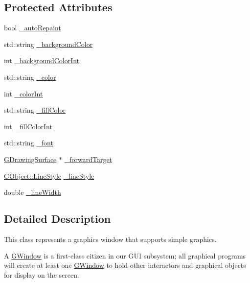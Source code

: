 \subsection*{Protected Attributes}
\begin{DoxyCompactItemize}
\item 
bool \mbox{\hyperlink{classsgl_1_1GDrawingSurface_a738dd6afc69ac536ad46cf4d89a90933}{\+\_\+auto\+Repaint}}
\item 
std\+::string \mbox{\hyperlink{classsgl_1_1GDrawingSurface_ad233544ea51cf6b435a199f3e3790607}{\+\_\+background\+Color}}
\item 
int \mbox{\hyperlink{classsgl_1_1GDrawingSurface_abb8452ab4f23ecf455b9e021bf09ef91}{\+\_\+background\+Color\+Int}}
\item 
std\+::string \mbox{\hyperlink{classsgl_1_1GDrawingSurface_a1134e770ae4315ea8bc1201e2f21da8b}{\+\_\+color}}
\item 
int \mbox{\hyperlink{classsgl_1_1GDrawingSurface_a003fdd343d9b7505c53a8b7a134200ed}{\+\_\+color\+Int}}
\item 
std\+::string \mbox{\hyperlink{classsgl_1_1GDrawingSurface_a179f8d6cee65cd8a54692e32b224392a}{\+\_\+fill\+Color}}
\item 
int \mbox{\hyperlink{classsgl_1_1GDrawingSurface_a751def333a67d651e5b99cc331ecb496}{\+\_\+fill\+Color\+Int}}
\item 
std\+::string \mbox{\hyperlink{classsgl_1_1GDrawingSurface_aea76ea1a8b5dd7b0a78653277e63b536}{\+\_\+font}}
\item 
\mbox{\hyperlink{classsgl_1_1GDrawingSurface}{G\+Drawing\+Surface}} $\ast$ \mbox{\hyperlink{classsgl_1_1GDrawingSurface_acbb02fa2a4a51a450fd1cc64dfc39ddd}{\+\_\+forward\+Target}}
\item 
\mbox{\hyperlink{classsgl_1_1GObject_a86e0f5648542856159bb40775c854aa7}{G\+Object\+::\+Line\+Style}} \mbox{\hyperlink{classsgl_1_1GDrawingSurface_ae15d02c66691247a6824dc5943a620e2}{\+\_\+line\+Style}}
\item 
double \mbox{\hyperlink{classsgl_1_1GDrawingSurface_a16e9033665937f13de2e163dc2184aff}{\+\_\+line\+Width}}
\end{DoxyCompactItemize}


\subsection{Detailed Description}
This class represents a graphics window that supports simple graphics. 

A \mbox{\hyperlink{classsgl_1_1GWindow}{G\+Window}} is a first-\/class citizen in our G\+UI subsystem; all graphical programs will create at least one \mbox{\hyperlink{classsgl_1_1GWindow}{G\+Window}} to hold other interactors and graphical objects for display on the screen.

